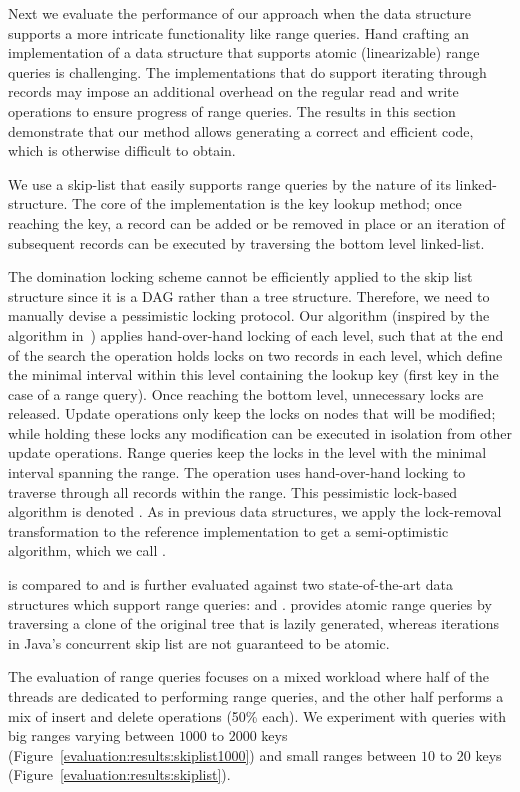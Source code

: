 Next we evaluate the performance of our approach when the data
structure supports a more intricate functionality like range queries. Hand
crafting an implementation of a data structure that supports atomic
(linearizable) range queries is challenging.
The implementations that do support iterating through records may impose an
additional overhead on the regular read and write operations to ensure
progress of range queries.
The results in this section demonstrate that our method
allows generating a correct and efficient code, which is otherwise difficult
to obtain.

We use a skip-list that easily supports range queries by the
nature of its linked-structure. The core of the implementation is the key lookup
method; once reaching the key, a record can be added or be removed in place or
an iteration of subsequent records can be executed by traversing
the bottom level linked-list.

The domination locking scheme cannot be efficiently applied to the skip list
structure since it is a DAG rather than a tree structure. Therefore, we need to
manually devise a pessimistic locking protocol. Our
algorithm (inspired by the algorithm in~\cite{HerlihyS2008}) applies
hand-over-hand locking of each level, such that at the end of the search the
operation holds locks on two records in each level, which define the minimal interval within this level
containing the lookup key (first key in the case of a range query). Once
reaching the bottom level, unnecessary locks are released. Update operations only keep
the locks on nodes that will be modified; while holding these locks any
modification can be executed in isolation from other update operations. Range
queries keep the locks in the level with the minimal interval spanning the
range. The operation uses hand-over-hand locking to traverse through all records
within the range. This pessimistic lock-based algorithm is denoted \domSkiplist. 
As in previous data structures, we  apply the lock-removal transformation to the
reference implementation to get a semi-optimistic algorithm, which we call
\autoSkiplist.  

\autoSkiplist is compared to \domSkiplist and is further evaluated against two
state-of-the-art data structures which support range queries: \bronson and
\skiplist.
\bronson provides atomic range queries by traversing a clone of the
original tree that is lazily generated,
whereas iterations in Java's concurrent skip list are not
guaranteed to be atomic.

The evaluation of range queries focuses on a mixed workload where half of the
threads are dedicated to performing range queries, and the other half performs a
mix of insert and delete operations (50\% each). 
We experiment with queries with big ranges varying between $1000$ to $2000$ keys
(Figure~\ref{evaluation:results:skiplist1000}) and small ranges
between $10$ to $20$
keys (Figure~\ref{evaluation:results:skiplist}).


